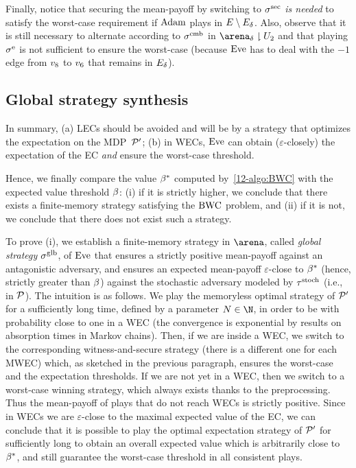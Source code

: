 \begin{example}
Finally, notice that securing the mean-payoff by switching to  $\sigma^{\text{sec}}$ \textit{is needed} to satisfy the worst-case requirement if $\text{Adam}$ plays in $E \setminus E_{\delta}$. Also, observe that it is still necessary to alternate according to $\sigma^{\text{cmb}}$ in $\gameNonZero \reduc \ec_{2}$ and that playing $\sigma^{\text{e}}$ is not sufficient to ensure the worst-case (because $\text{Eve}$ has to deal with the $-1$ edge from $v_{8}$ to $v_{6}$ that remains in $E_{\delta}$).
\end{example}


\subsection*{Global strategy synthesis} In summary, (a) LECs should be avoided and will be by a strategy that optimizes the expectation on the MDP~${\mathcal{P}}'$; (b) in WECs, $\text{Eve}$ can obtain ($\varepsilon$-closely) the expectation of the EC \textit{and} ensure the worst-case threshold.

Hence, we finally compare the value $\beta^{\ast}$ computed by~\cref{12-algo:BWC} with the expected value threshold $\beta$: (i) if it is strictly higher, we conclude that there exists a finite-memory strategy satisfying the $\text{BWC}$ problem, and (ii) if it is not, we conclude that there does not exist such a strategy.

To prove (i), we establish a finite-memory strategy in $\arena$, called \textit{global strategy} $\sigma^{\text{glb}}$, of $\text{Eve}$ that ensures a strictly positive mean-payoff against an antagonistic adversary, and ensures an expected mean-payoff $\varepsilon$-close to $\beta^{\ast}$ (hence, strictly greater than $\beta$) against the stochastic adversary modeled by $\tau^{\text{stoch}}$ (i.e., in ${\mathcal{P}}$). The intuition is as follows. We play the memoryless optimal strategy of ${\mathcal{P}}'$ for a sufficiently long time, defined by a parameter $\stepsGlobal \in \N$, in order to be with probability close to one in a WEC (the convergence is exponential by results on absorption times in Markov chains). Then, if we are inside a WEC, we switch to the corresponding witness-and-secure strategy (there is a different one for each MWEC) which, as sketched in the previous paragraph, ensures the worst-case and the expectation thresholds. If we are not yet in a WEC, then we switch to a worst-case winning strategy, which always exists thanks to the preprocessing. Thus the mean-payoff of plays that do not reach WECs is strictly positive. Since in WECs we are $\varepsilon$-close to the maximal expected value of the EC, we can conclude that it is possible to play the optimal expectation strategy of ${\mathcal{P}}'$ for sufficiently long to obtain an overall expected value which is arbitrarily close to $\beta^{\ast}$, and still guarantee the worst-case threshold in all consistent plays.

